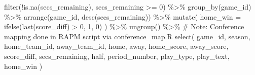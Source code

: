 \documentclass[
  letterpaper,
  DIV=11,
  numbers=noendperiod]{scrartcl}
\newenvironment{Shaded}{\begin{snugshade}}{\end{snugshade}}
\newcommand{\AttributeTok}[1]{\textcolor[rgb]{0.40,0.45,0.13}{#1}}
\newcommand{\CommentTok}[1]{\textcolor[rgb]{0.37,0.37,0.37}{#1}}
\newcommand{\DecValTok}[1]{\textcolor[rgb]{0.68,0.00,0.00}{#1}}
\newcommand{\FunctionTok}[1]{\textcolor[rgb]{0.28,0.35,0.67}{#1}}
\newcommand{\NormalTok}[1]{\textcolor[rgb]{0.00,0.23,0.31}{#1}}
\newcommand{\SpecialCharTok}[1]{\textcolor[rgb]{0.37,0.37,0.37}{#1}}
\begin{document}
\begin{Shaded}
\begin{Highlighting}[]
  \FunctionTok{filter}\NormalTok{(}\SpecialCharTok{!}\FunctionTok{is.na}\NormalTok{(secs\_remaining), secs\_remaining }\SpecialCharTok{\textgreater{}=} \DecValTok{0}\NormalTok{) }\SpecialCharTok{\%\textgreater{}\%}
  \FunctionTok{group\_by}\NormalTok{(game\_id) }\SpecialCharTok{\%\textgreater{}\%}
  \FunctionTok{arrange}\NormalTok{(game\_id, }\FunctionTok{desc}\NormalTok{(secs\_remaining)) }\SpecialCharTok{\%\textgreater{}\%}
  \FunctionTok{mutate}\NormalTok{(}
    \AttributeTok{home\_win =} \FunctionTok{ifelse}\NormalTok{(}\FunctionTok{last}\NormalTok{(score\_diff) }\SpecialCharTok{\textgreater{}} \DecValTok{0}\NormalTok{, }\DecValTok{1}\NormalTok{, }\DecValTok{0}\NormalTok{)}
\NormalTok{  ) }\SpecialCharTok{\%\textgreater{}\%}
  \FunctionTok{ungroup}\NormalTok{() }\SpecialCharTok{\%\textgreater{}\%}
  \CommentTok{\# Note: Conference mapping done in RAPM script via conference\_map.R}
  \FunctionTok{select}\NormalTok{(}
\NormalTok{    game\_id, season, home\_team\_id, away\_team\_id, home, away,}
\NormalTok{    home\_score, away\_score, score\_diff,}
\NormalTok{    secs\_remaining, half, period\_number, play\_type, play\_text, home\_win}
\NormalTok{  )}


\end{Highlighting}
\end{Shaded}
\end{document}

